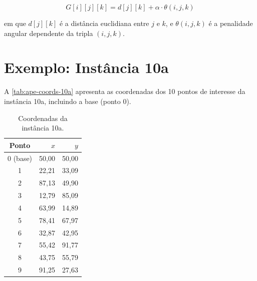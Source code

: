 \begin{equation}
G[i][j][k] = d[j][k] + \alpha \cdot \theta(i,j,k)
\end{equation}

em que $d[j][k]$ é a distância euclidiana entre $j$ e $k$, e $\theta(i,j,k)$ é a penalidade angular dependente da tripla $(i,j,k)$.

\section{Exemplo: Instância 10a}

A \autoref{tab:ape-coords-10a} apresenta as coordenadas dos 10 pontos de interesse da instância 10a, incluindo a base (ponto 0).

\begin{table}[htbp]
\centering
\caption{Coordenadas da instância 10a.}
\label{tab:ape-coords-10a}
\begin{tabular}{crr}
\toprule
Ponto & $x$ & $y$ \\
\midrule
0 (base) & 50,00 & 50,00 \\
1 & 22,21 & 33,09 \\
2 & 87,13 & 49,90 \\
3 & 12,79 & 85,09 \\
4 & 63,99 & 14,89 \\
5 & 78,41 & 67,97 \\
6 & 32,87 & 42,95 \\
7 & 55,42 & 91,77 \\
8 & 43,75 & 55,79 \\
9 & 91,25 & 27,63 \\
\bottomrule
\end{tabular}
\end{table}
